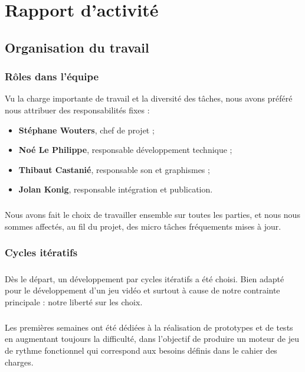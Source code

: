 \chapter{Rapport d'activité}

\section{Organisation du travail}

\subsection{Rôles dans l’équipe}
Vu la charge importante de travail et la diversité des tâches, nous avons préféré nous attribuer des responsabilités fixes :
 
\begin{itemize}
\item \textbf{Stéphane Wouters}, chef de projet ;
\item \textbf{Noé Le Philippe}, responsable développement technique ;
\item \textbf{Thibaut Castanié}, responsable son et graphismes ;
\item \textbf{Jolan Konig}, responsable intégration et publication.
\end{itemize}
 
\paragraph{}
Nous avons fait le choix de travailler ensemble sur toutes les parties, et nous nous sommes affectés, au fil du projet, des micro tâches fréquements mises à jour.

\subsection{Cycles itératifs}
 
\paragraph{}
Dès le départ, un développement par cycles itératifs a été choisi. Bien adapté pour le développement d’un jeu vidéo et surtout à cause de notre contrainte principale : notre liberté sur les choix.
 
\paragraph{}
Les premières semaines ont été dédiées à la réalisation de prototypes et de tests en augmentant toujours la difficulté, dans l’objectif de produire un moteur de jeu de rythme fonctionnel qui correspond aux besoins définis dans le cahier des charges.
 
